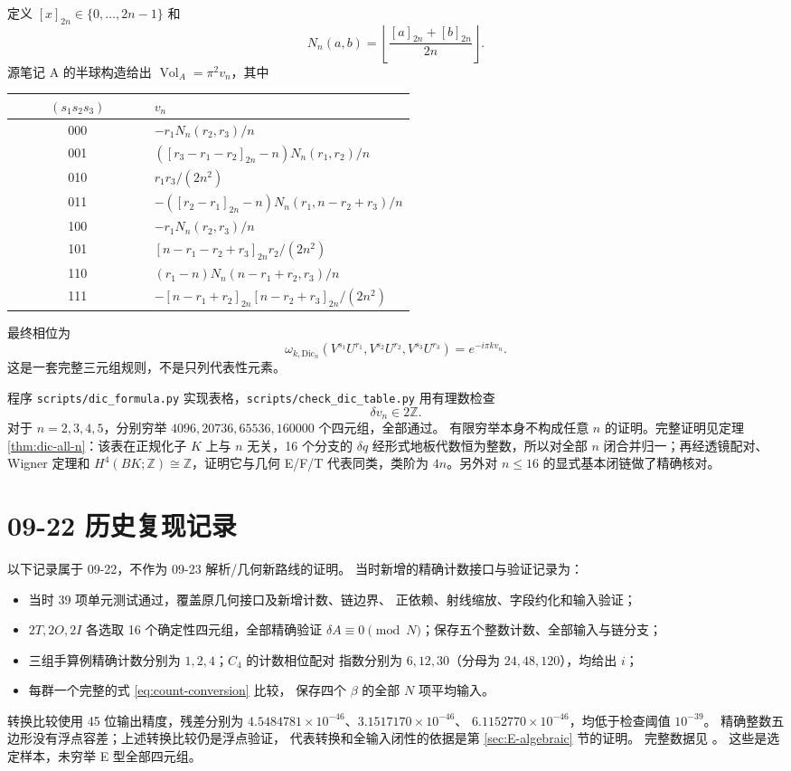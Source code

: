 \documentclass[UTF8,11pt,fontset=none]{ctexart}
\newcommand{\Dic}{\mathrm{Dic}}
\newcommand{\Vol}{\operatorname{Vol}}
\newcommand{\Z}{\mathbb Z}
\theoremstyle{definition}
\begin{document}
定义 $[x]_{2n}\in\{0,\ldots,2n-1\}$ 和
\[
N_n(a,b)=\left\lfloor\frac{[a]_{2n}+[b]_{2n}}{2n}\right\rfloor.
\]
源笔记 A 的半球构造给出 $\Vol_A=\pi^2v_n$，其中
\begin{longtable}{@{}c p{0.65\linewidth}@{}}
\toprule
$(s_1s_2s_3)$ & $v_n$\\ \midrule
000 & $-r_1N_n(r_2,r_3)/n$\\
001 & $([r_3-r_1-r_2]_{2n}-n)N_n(r_1,r_2)/n$\\
010 & $r_1r_3/(2n^2)$\\
011 & $-([r_2-r_1]_{2n}-n)N_n(r_1,n-r_2+r_3)/n$\\
100 & $-r_1N_n(r_2,r_3)/n$\\
101 & $[n-r_1-r_2+r_3]_{2n}r_2/(2n^2)$\\
110 & $(r_1-n)N_n(n-r_1+r_2,r_3)/n$\\
111 & $-[n-r_1+r_2]_{2n}[n-r_2+r_3]_{2n}/(2n^2)$\\
\bottomrule
\end{longtable}
最终相位为
\[
\boxed{\omega_{k,\Dic_n}(V^{s_1}U^{r_1},V^{s_2}U^{r_2},V^{s_3}U^{r_3})
=e^{-i\pi k v_n}.}
\]
这是一套完整三元组规则，不是只列代表性元素。

程序 \texttt{scripts/dic\_formula.py} 实现表格，\texttt{scripts/check\_dic\_table.py} 用有理数检查
\[
\delta v_n\in2\mathbb Z.
\]
对于 $n=2,3,4,5$，分别穷举 $4096,20736,65536,160000$ 个四元组，全部通过。
有限穷举本身不构成任意 $n$ 的证明。完整证明见定理 \ref{thm:dic-all-n}：该表在正规化子 $K$ 上与 $n$ 无关，16 个分支的 $\delta q$ 经形式地板代数恒为整数，所以对全部 $n$ 闭合并归一；再经透镜配对、Wigner 定理和 $H^4(BK;\Z)\cong\Z$，证明它与几何 E/F/T 代表同类，类阶为 $4n$。另外对 $n\le16$ 的显式基本闭链做了精确核对。




\section{09-22 历史复现记录}\label{sec:ade-validation}

以下记录属于 09-22，不作为 09-23 解析/几何新路线的证明。
当时新增的精确计数接口与验证记录为：
\begin{itemize}
\item 当时 39 项单元测试通过，覆盖原几何接口及新增计数、链边界、
正依赖、射线缩放、字段约化和输入验证；
\item $2T,2O,2I$ 各选取 16 个确定性四元组，全部精确验证
$\delta A\equiv0\pmod N$；保存五个整数计数、全部输入与链分支；
\item 三组手算例精确计数分别为 $1,2,4$；$C_4$ 的计数相位配对
指数分别为 $6,12,30$（分母为 $24,48,120$），均给出 $i$；
\item 每群一个完整的式 \eqref{eq:count-conversion} 比较，
保存四个 $\beta$ 的全部 $N$ 项平均输入。
\end{itemize}
转换比较使用 45 位输出精度，残差分别为
$4.5484781\times10^{-46}$、$3.1517170\times10^{-46}$、
$6.1152770\times10^{-46}$，均低于检查阈值 $10^{-39}$。
精确整数五边形没有浮点容差；上述转换比较仍是浮点验证，
代表转换和全输入闭性的依据是第 \ref{sec:E-algebraic} 节的证明。
完整数据见 。
这些是选定样本，未穷举 E 型全部四元组。
\end{document}
